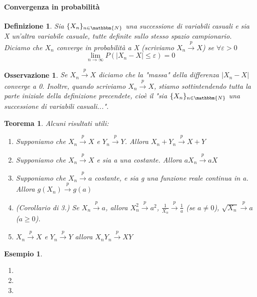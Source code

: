 \documentclass[11pt]{article}
\newtheorem{oss}{Osservazione}
\newtheorem{definizione}{Definizione}
\newtheorem{esempio}{Esempio}
\newtheorem{teo}{Teorema}
\begin{document}
\paragraph{Convergenza in probabilità}
\begin{definizione}

Sia $\{X_n\}_{n\in\mathbbm{N}}$ una successione di variabili casuali e 
sia X un'altra variabile casuale, tutte definite sullo stesso spazio campionario.
Diciamo che $X_n$ converge in probabilità a X (scriviamo $X_n\stackrel{p}{\rightarrow}X$) se $\forall\varepsilon>0$ $$\lim_{n \rightarrow\infty} P(|X_n-X|\leq\varepsilon)=0$$
\end{definizione}
\begin{oss}
Se $X_n\stackrel{p}{\rightarrow}X$ diciamo che la "massa" della differenza $|X_n-X|$ converge a 0.
Inoltre, quando scriviamo $X_n\stackrel{p}{\rightarrow}X$, stiamo sottintendendo tutta la parte iniziale della definizione precendete, cioè il "sia $\{X_n\}_{n\in\mathbbm{N}}$ una successione di variabili casuali...".
\end{oss}
\begin{teo} Alcuni risultati utili: 

\begin{enumerate}
\item Supponiamo che  $X_n\stackrel{p}{\rightarrow}X$ e  $Y_n\stackrel{p}{\rightarrow}Y$. Allora  $X_n+Y_n\stackrel{p}{\rightarrow}X+Y$
\item Supponiamo che $X_n\stackrel{p}{\rightarrow}X$ e sia a una costante. Allora $aX_n\stackrel{p}{\rightarrow}aX$ 
\item Supponiamo che  $X_n\stackrel{p}{\rightarrow}a$ costante, e sia g una funzione reale continua in a. Allora  $g(X_n)\stackrel{p}{\rightarrow}g(a)$
\item (Corollario di 3.) Se $X_n\stackrel{p}{\rightarrow}a$, allora $X_n^2\stackrel{p}{\rightarrow}a^2$, $\frac{1}{X_n}\stackrel{p}{\rightarrow}\frac{1}{a}$ (se $a\neq0$), $\sqrt{X_n}\stackrel{p}{\rightarrow}{a}$ ($a\geq0$).
\item $X_n\stackrel{p}{\rightarrow}X$ e $Y_n\stackrel{p}{\rightarrow}Y$ allora $X_nY_n\stackrel{p}{\rightarrow}XY$
\end{enumerate}
\end{teo}
\begin{esempio}
\begin{enumerate}
\item
\item
\item
\end{enumerate}
\end{esempio}
\end{document}
